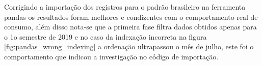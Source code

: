     	            \begin{figure}[htb]
                    \end{figure}

                    Corrigindo a importação dos registros para o padrão brasileiro na ferramenta pandas os resultados foram melhores e condizentes com o comportamento real de consumo, além disso nota-se que a primeira fase filtra dados obtidos apenas para o 1o semestre de 2019 e no caso da indexação incorreta na figura \ref{fig:pandas_wrong_indexing} a ordenação ultrapassou o mês de julho, este foi o comportamento que indicou a investigação no código de importação.
                    
                    \begin{figure}[htb]
                    \end{figure}
                    
